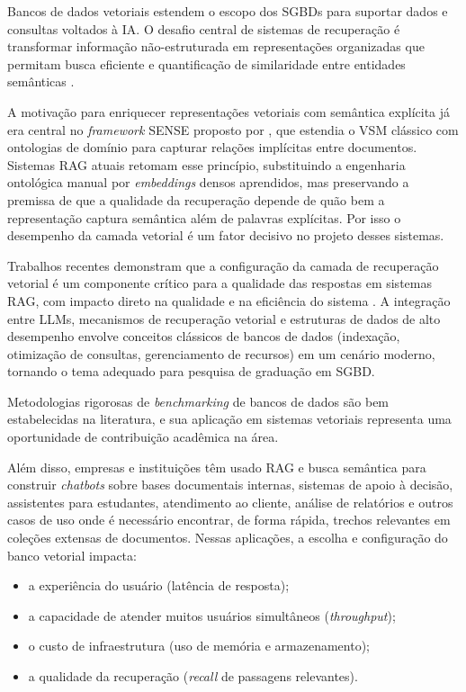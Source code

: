 Bancos de dados vetoriais estendem o escopo dos SGBDs para suportar dados e consultas voltados à IA. O desafio central de sistemas de recuperação é transformar informação não-estruturada em representações organizadas que permitam busca eficiente e quantificação de similaridade entre entidades semânticas \cite{paiva2014semrelext,costa2014sense}.

A motivação para enriquecer representações vetoriais com semântica explícita já era central no \textit{framework} SENSE proposto por , que estendia o VSM clássico com ontologias de domínio para capturar relações implícitas entre documentos. Sistemas RAG atuais retomam esse princípio, substituindo a engenharia ontológica manual por \textit{embeddings} densos aprendidos, mas preservando a premissa de que a qualidade da recuperação depende de quão bem a representação captura semântica além de palavras explícitas. Por isso o desempenho da camada vetorial é um fator decisivo no projeto desses sistemas.

Trabalhos recentes demonstram que a configuração da camada de recuperação vetorial é um componente crítico para a qualidade das respostas em sistemas RAG, com impacto direto na qualidade e na eficiência do sistema \cite{pawlik2025rag}. A integração entre LLMs, mecanismos de recuperação vetorial e estruturas de dados de alto desempenho envolve conceitos clássicos de bancos de dados (indexação, otimização de consultas, gerenciamento de recursos) em um cenário moderno, tornando o tema adequado para pesquisa de graduação em SGBD.

Metodologias rigorosas de \textit{benchmarking} de bancos de dados são bem estabelecidas na literatura, e sua aplicação em sistemas vetoriais representa uma oportunidade de contribuição acadêmica na área.

Além disso, empresas e instituições têm usado RAG e busca semântica para construir \textit{chatbots} sobre bases documentais internas, sistemas de apoio à decisão, assistentes para estudantes, atendimento ao cliente, análise de relatórios e outros casos de uso onde é necessário encontrar, de forma rápida, trechos relevantes em coleções extensas de documentos. Nessas aplicações, a escolha e configuração do banco vetorial impacta:

\begin{itemize}
    \item a experiência do usuário (latência de resposta);
    \item a capacidade de atender muitos usuários simultâneos (\textit{throughput});
    \item o custo de infraestrutura (uso de memória e armazenamento);
    \item a qualidade da recuperação (\textit{recall} de passagens relevantes).
\end{itemize}

